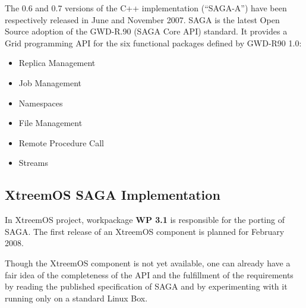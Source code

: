     The 0.6 and 0.7 versions of the C++ implementation (``SAGA-A'') have been
    respectively released in June and November 2007. SAGA is the
    latest Open Source adoption of the GWD-R.90 (SAGA Core API) standard. It
    provides a Grid programming API for the six functional
    packages defined by GWD-R90 1.0:
    \begin{itemize}
     \item Replica Management
     \item Job Management
     \item Namespaces
     \item File Management
     \item Remote Procedure Call
     \item Streams
    \end{itemize}
    


  \subsection{XtreemOS SAGA Implementation}

  In XtreemOS project, workpackage {\bfseries WP 3.1} is responsible
  for the porting of SAGA. The first release of an XtreemOS component is
  planned for February 2008. 


  Though the XtreemOS component is not yet available, one can already 
  have a fair idea of the completeness of the API 
  and the fulfillment of the requirements by reading the published
  specification of SAGA and by experimenting with it running only on a
  standard Linux Box. %



